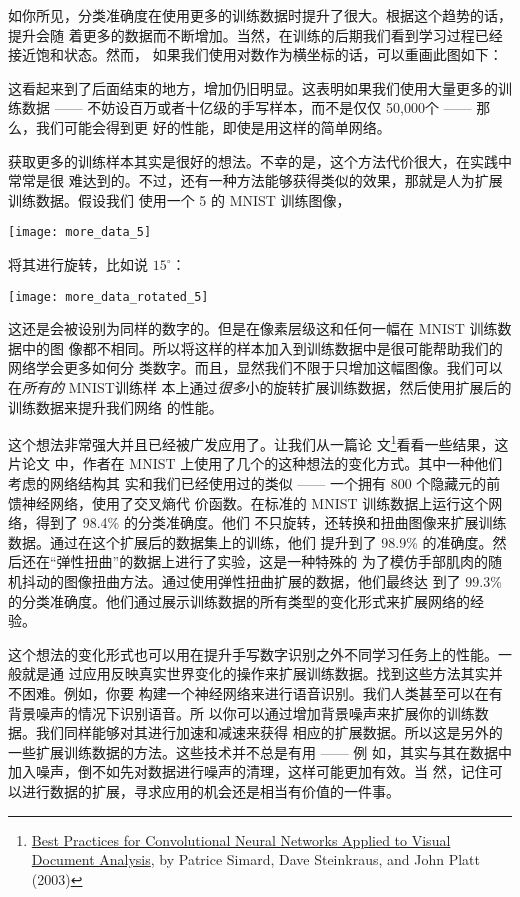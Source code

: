 如你所见，分类准确度在使用更多的训练数据时提升了很大。根据这个趋势的话，提升会随
着更多的数据而不断增加。当然，在训练的后期我们看到学习过程已经接近饱和状态。然而，
如果我们使用对数作为横坐标的话，可以重画此图如下：

这看起来到了后面结束的地方，增加仍旧明显。这表明如果我们使用大量更多的训练数据
—— 不妨设百万或者十亿级的手写样本，而不是仅仅 50,000个 —— 那么，我们可能会得到更
好的性能，即使是用这样的简单网络。

获取更多的训练样本其实是很好的想法。不幸的是，这个方法代价很大，在实践中常常是很
难达到的。不过，还有一种方法能够获得类似的效果，那就是人为扩展训练数据。假设我们
使用一个 5 的 MNIST 训练图像，
\begin{center}
  \texttt{[image: more\_data\_5]}
\end{center}
将其进行旋转，比如说 $15^{\circ}$：
\begin{center}
  \texttt{[image: more\_data\_rotated\_5]}
\end{center}

这还是会被设别为同样的数字的。但是在像素层级这和任何一幅在 MNIST 训练数据中的图
像都不相同。所以将这样的样本加入到训练数据中是很可能帮助我们的网络学会更多如何分
类数字。而且，显然我们不限于只增加这幅图像。我们可以在\emph{所有的} MNIST训练样
本上通过\emph{很多}小的旋转扩展训练数据，然后使用扩展后的训练数据来提升我们网络
的性能。

这个想法非常强大并且已经被广发应用了。让我们从一篇论
文\footnote{\href{http://dx.doi.org/10.1109/ICDAR.2003.1227801}{Best Practices
    for Convolutional Neural Networks Applied to Visual Document Analysis}, by
  Patrice Simard, Dave Steinkraus, and John Platt (2003)}看看一些结果，这片论文
中，作者在 MNIST 上使用了几个的这种想法的变化方式。其中一种他们考虑的网络结构其
实和我们已经使用过的类似 —— 一个拥有 800 个隐藏元的前馈神经网络，使用了交叉熵代
价函数。在标准的 MNIST 训练数据上运行这个网络，得到了 98.4\% 的分类准确度。他们
不只旋转，还转换和扭曲图像来扩展训练数据。通过在这个扩展后的数据集上的训练，他们
提升到了 98.9\% 的准确度。然后还在``弹性扭曲''的数据上进行了实验，这是一种特殊的
为了模仿手部肌肉的随机抖动的图像扭曲方法。通过使用弹性扭曲扩展的数据，他们最终达
到了 99.3\% 的分类准确度。他们通过展示训练数据的所有类型的变化形式来扩展网络的经
验。

这个想法的变化形式也可以用在提升手写数字识别之外不同学习任务上的性能。一般就是通
过应用反映真实世界变化的操作来扩展训练数据。找到这些方法其实并不困难。例如，你要
构建一个神经网络来进行语音识别。我们人类甚至可以在有背景噪声的情况下识别语音。所
以你可以通过增加背景噪声来扩展你的训练数据。我们同样能够对其进行加速和减速来获得
相应的扩展数据。所以这是另外的一些扩展训练数据的方法。这些技术并不总是有用 —— 例
如，其实与其在数据中加入噪声，倒不如先对数据进行噪声的清理，这样可能更加有效。当
然，记住可以进行数据的扩展，寻求应用的机会还是相当有价值的一件事。


